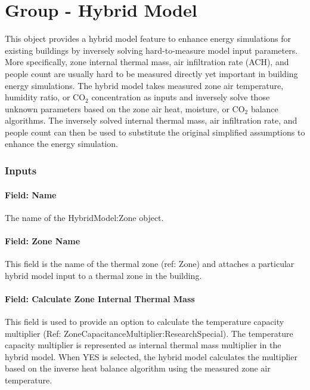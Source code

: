 \section{Group - Hybrid Model}\label{group---hybrid-model}

This object provides a hybrid model feature to enhance energy simulations for existing buildings by inversely solving hard-to-measure model input parameters. More specifically, zone internal thermal mass, air infiltration rate (ACH), and people count are usually hard to be measured directly yet important in building energy simulations. The hybrid model takes measured zone air temperature, humidity ratio, or CO$_2$ concentration as inputs and inversely solve those unknown parameters based on the zone air heat, moisture, or CO$_2$ balance algorithms. The inversely solved internal thermal mass, air infiltration rate, and people count can then be used to substitute the original simplified assumptions to enhance the energy simulation.

\subsubsection{Inputs}\label{inputs-hm}

\paragraph{Field: Name}\label{field-name-hm}
The name of the HybridModel:Zone object.

\paragraph{Field: Zone Name}\label{field-zone-name-hm}
This field is the name of the thermal zone (ref: Zone) and attaches a particular hybrid model input to a thermal zone in the building.

\paragraph{Field: Calculate Zone Internal Thermal Mass}\label{field-calculate-zon-internal-thermal-mass-hm}
This field is used to provide an option to calculate the temperature capacity multiplier (Ref: ZoneCapacitanceMultiplier:ResearchSpecial). The temperature capacity multiplier is represented as internal thermal mass multiplier in the hybrid model.
When YES is selected, the hybrid model calculates the multiplier based on the inverse heat balance algorithm using the measured zone air temperature.


